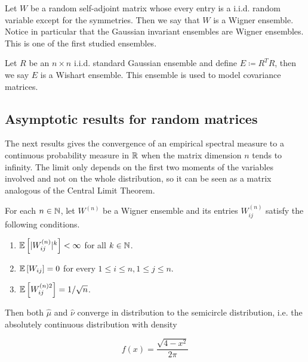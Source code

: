 \begin{example}
    Let $W$ be a random self-adjoint matrix whose every entry is a i.i.d. random variable except for the symmetries. Then we say that $W$ is a Wigner ensemble. Notice in particular that the Gaussian invariant ensembles are Wigner ensembles. This is one of the first studied ensembles.
\end{example}

\begin{example}
    Let $R$ be an $n\times n$ i.i.d. standard Gaussian ensemble and define $E \coloneqq R^T R$, then we say $E$ is a Wishart ensemble. This ensemble is used to model covariance matrices. 
\end{example}

\subsection{Asymptotic results for random matrices}


The next results gives the convergence of an empirical spectral measure to a continuous probability measure in $\mathbb R$ when the matrix dimension $n$ tends to infinity. The limit only depends on the first two moments of the variables involved and not on the whole distribution, so it can be seen as a matrix analogous of the Central Limit Theorem.

\begin{theorem}
    For each $n\in \mathbb N$, let $W^{(n)}$ be a Wigner ensemble  and its entries $W_{ij}^{(n)}$ satisfy the following conditions.

    \begin{enumerate}
        \item $\mathbb E \left[ \lvert W_{ij}^{(n)} \rvert^k \right]<\infty$ for all $k\in \mathbb N$.
        \item $\mathbb E \left[ W_{ij} \right] = 0$ for every $1 \le i \le n, 1 \le j \le n$.
        \item $\mathbb E \left[  W_{ij}^{(n) 2}  \right] = 1/\sqrt{n}$.
    \end{enumerate}

    Then both $\hat\mu$ and $\hat\nu$ converge in distribution to the semicircle distribution, i.e. the absolutely continuous distribution with density

    \begin{equation*}
        f(x) = \frac{\sqrt{4 - x^2}}{2\pi}
    \end{equation*}
\end{theorem}